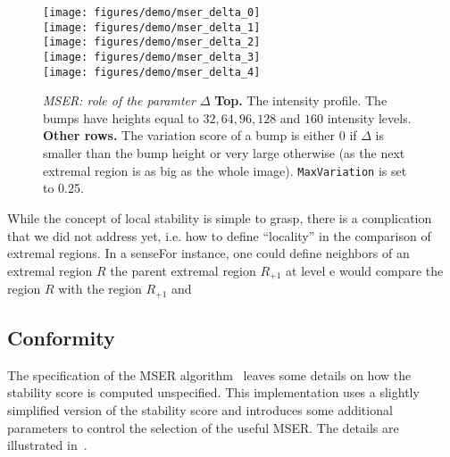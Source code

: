 \documentclass[9.5pt]{article}
\newcommand{\param}[1]{{\color{red}\tt   #1}}
\begin{document}
\begin{figure}
\begin{center}
\texttt{[image: figures/demo/mser\_delta\_0]}\\
\texttt{[image: figures/demo/mser\_delta\_1]}\\
\texttt{[image: figures/demo/mser\_delta\_2]}\\
\texttt{[image: figures/demo/mser\_delta\_3]}\\
\texttt{[image: figures/demo/mser\_delta\_4]}
\end{center}
\caption{{\em MSER: role of the paramter $\Delta$} {\bf Top.} The intensity profile. The bumps
have heights equal to $32,64,96,128$ and $160$ intensity levels. {\bf Other rows.} The variation score of a bump is either $0$ if $\Delta$ is smaller than the bump height or very large otherwise (as the next extremal region is as big as the whole image). 
\param{MaxVariation} is set to 0.25.}
\label{fig:mser-delta}
\end{figure}

While the concept of local stability is simple to grasp, there is a
complication that we did not address yet, i.e. how to define
``locality'' in the comparison of extremal regions. In a senseFor
instance, one could define neighbors of an extremal region $R$ the
parent extremal region $R_{+1}$ at level e would compare the region
$R$ with the region $R_{+1}$ and

\subsection{Conformity}\label{mser.conformity}

The specification of the MSER algorithm~\cite{matas03robust} leaves
some details on how the stability score is computed unspecified. This
implementation uses a slightly simplified version of the stability
score and introduces some additional parameters to control the
selection of the useful MSER. The details are illustrated
in~\cite{vedaldi07vlfeat-dox}.

\end{document}
